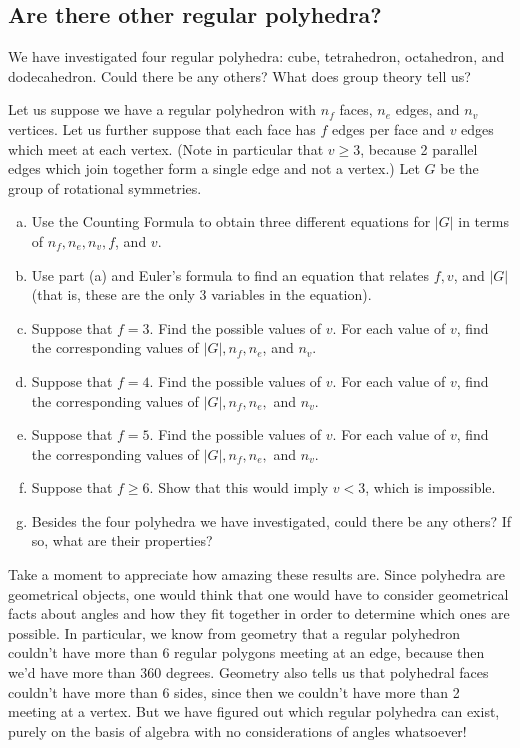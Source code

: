 \subsection{Are there  other regular polyhedra?}

We have investigated four regular polyhedra: cube, tetrahedron, octahedron, and dodecahedron.  Could there be any others?  What does group theory tell us? 


\begin{exercise}\label{exercise:actions:allPoly}
Let us suppose we have a regular polyhedron with $n_f$ faces, $n_e$ edges, and $n_v$ vertices.  Let us further suppose that each face has $f$ edges per face and $v$ edges which meet at each vertex. (Note in particular that $v \ge 3$, because 2 parallel edges which join together form a single edge and not a vertex.) Let $G$ be the group of rotational symmetries.
\begin{enumerate}[(a)]
\item
Use the Counting Formula to obtain three different equations for $|G|$ in terms of $n_f, n_e, n_v, f$, and $v$.
\item
Use part (a) and Euler's formula to find an equation that relates $f, v$, and $|G|$ (that is, these are the only 3 variables in the equation).
\item
Suppose that $f=3$.  Find the possible values of $v$.  For each value of $v$, find the corresponding values of $|G|, n_f, n_e$, and $n_v$.
\item
Suppose that $f=4$.  Find the possible values of $v$.  For each value of $v$, find the corresponding values of $|G|, n_f, n_e,$ and $n_v$.
\item
Suppose that $f=5$.  Find the possible values of $v$.  For each value of $v$, find the corresponding values of $|G|, n_f, n_e,$ and $n_v$.
\item
Suppose that $f \ge 6$. Show that this would imply $v<3$, which is impossible.
\item
Besides the four polyhedra we have investigated, could there be any others? If so, what are their properties?
\end{enumerate}
\end{exercise}

Take a moment to appreciate how amazing these results are.  Since polyhedra are geometrical objects, one would think that one would have to consider geometrical facts about angles and how they fit together in order to determine which ones are possible.  In particular, we know from geometry that a regular polyhedron couldn't have more than 6 regular polygons meeting at an edge, because then we'd have more than 360 degrees. Geometry also tells us that polyhedral faces couldn't have more than 6 sides, since then we couldn't have more than 2 meeting at a vertex. But we have figured out which regular polyhedra can exist, purely on the basis of algebra with no considerations of angles whatsoever!  

